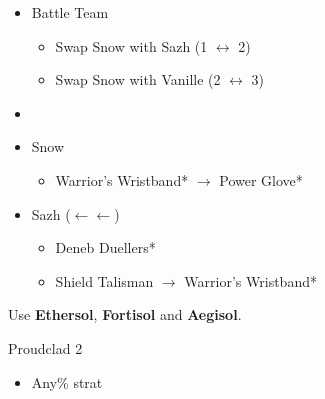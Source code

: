 \begin{menu}
	\begin{itemize}
		\paradigm
		\begin{itemize}
			\item Battle Team
				\begin{itemize}
					\item Swap Snow with Sazh (1 $\leftrightarrow$ 2)
					\item Swap Snow with Vanille (2 $\leftrightarrow$ 3)
				\end{itemize}
			\item {}%
				{\paradigmline{(\rav)}{(\com)}{\com}}%
				{\paradigmline[4]{\com}{\com}{\com}}%
				{\paradigmline{(\rav)}{(\rav)}{\sen}}%
				{\paradigmline{(\com)}{\med}{(\sen)}}%
				{\paradigmline{\rav}{(\rav)}{(\com)}}%
				{\paradigmline{\rav}{\rav}{\rav}}%
		\end{itemize}
		\equip
		\begin{itemize}
			\item Snow
				\begin{itemize}
					\item Warrior's Wristband* $\rightarrow$ Power Glove*
				\end{itemize}
			\item Sazh ($\leftarrow\leftarrow$)
				\begin{itemize}
					\item Deneb Duellers*
					\item Shield Talisman $\rightarrow$ Warrior's Wristband*
				\end{itemize}
		\end{itemize}
	\end{itemize}
\end{menu}

Use \textbf{Ethersol}, \textbf{Fortisol} and \textbf{Aegisol}.

\begin{battle}{Proudclad 2}
	\begin{itemize}
		\item Any\% strat
	\end{itemize}
\end{battle}